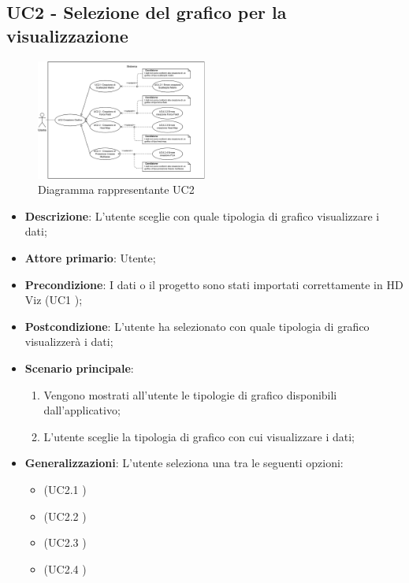 \subsection{UC2 - Selezione del grafico per la visualizzazione}
\label{sub:uc2}

\begin{figure}[h]
    \centering
    \includegraphics[width=0.5\textwidth]{componenti/casi-duso/diagrammi/UC2.pdf}
    \caption{Diagramma rappresentante UC2}
    \label{fig:UC2}
\end{figure}

\begin{itemize}
	\item \textbf{Descrizione}: L'utente sceglie con quale tipologia di grafico visualizzare i dati;
	\item \textbf{Attore primario}: Utente;
	\item \textbf{Precondizione}: I dati o il progetto sono stati importati correttamente in HD Viz (UC1 );
	\item \textbf{Postcondizione}: L'utente ha selezionato con quale tipologia di grafico visualizzerà i dati;
	\item \textbf{Scenario principale}:
		\begin{enumerate}
			\item Vengono mostrati all'utente le tipologie di grafico disponibili dall'applicativo;
			\item L'utente sceglie la tipologia di grafico con cui visualizzare i dati;
		\end{enumerate}
	\item \textbf{Generalizzazioni}: L'utente seleziona una tra le seguenti opzioni:
		\begin{itemize}
			\item \emph{} (UC2.1 )
			\item \emph{} (UC2.2 )
			\item \emph{} (UC2.3 )
			\item \emph{} (UC2.4 )
		\end{itemize}
\end{itemize}

